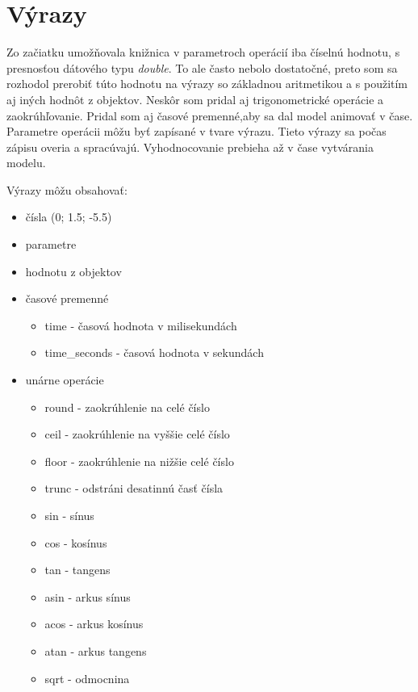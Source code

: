 \section{Výrazy}
\label{sec:vyrazy}
Zo začiatku umožňovala knižnica v parametroch operácií iba číselnú hodnotu, s presnosťou dátového typu \textit{double}. To ale často nebolo dostatočné, preto som sa rozhodol prerobiť túto hodnotu na výrazy so základnou aritmetikou a s použitím aj iných hodnôt z objektov. Neskôr som pridal aj trigonometrické operácie a zaokrúhľovanie. Pridal som aj  časové premenné,aby sa dal model animovať v čase.
Parametre operácii môžu byť zapísané v tvare výrazu. Tieto výrazy sa počas zápisu overia a spracúvajú. Vyhodnocovanie prebieha až v čase vytvárania modelu.

Výrazy môžu obsahovať: 
\begin{itemize}
    \item  čísla (0; 1.5; -5.5)
    \item  parametre 
    \item  hodnotu z objektov 
    \item  časové premenné
        \begin{itemize}
            \item  time - časová hodnota v milisekundách
            \item  time\_seconds - časová hodnota v sekundách
         \end{itemize}
    \item  unárne operácie
        \begin{itemize}
            \item  round - zaokrúhlenie na celé číslo
            \item  ceil - zaokrúhlenie na vyššie celé číslo
            \item  floor  - zaokrúhlenie na nižšie celé číslo
            \item  trunc  - odstráni desatinnú časť čísla
            \item  sin - sínus
            \item  cos - kosínus
            \item  tan - tangens
            \item  asin - arkus sínus 
            \item  acos - arkus kosínus
            \item  atan - arkus tangens
            \item  sqrt - odmocnina
         \end{itemize}

\end{itemize}
